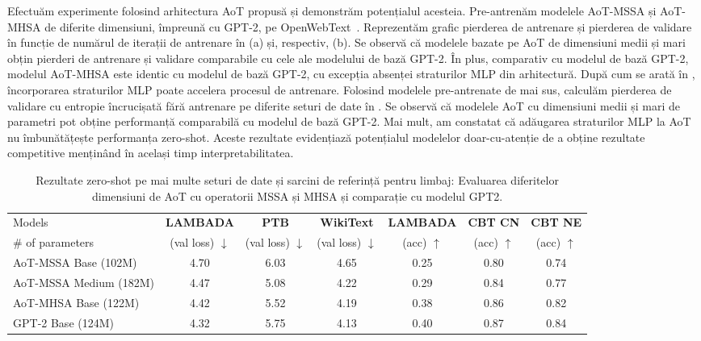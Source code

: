\documentclass[../../book-main_ro.tex]{subfiles}
\begin{document}
Efectuăm experimente folosind arhitectura AoT propusă și demonstrăm potențialul acesteia. Pre-antrenăm modelele AoT-MSSA și AoT-MHSA de diferite dimensiuni, împreună cu GPT-2, pe OpenWebText~\citep{Gokaslan2019OpenWeb}. Reprezentăm grafic pierderea de antrenare și pierderea de validare în funcție de numărul de iterații de antrenare în (a) și, respectiv, (b). Se observă că modelele bazate pe AoT de dimensiuni medii și mari obțin pierderi de antrenare și validare comparabile cu cele ale modelului de bază GPT-2. În plus, comparativ cu modelul de bază GPT-2, modelul AoT-MHSA este identic cu modelul de bază GPT-2, cu excepția absenței straturilor MLP din arhitectură. După cum se arată în , încorporarea straturilor MLP poate accelera procesul de antrenare. Folosind modelele pre-antrenate de mai sus, calculăm pierderea de validare cu entropie încrucișată fără antrenare pe diferite seturi de date în . Se observă că modelele AoT cu dimensiuni medii și mari de parametri pot obține performanță comparabilă cu modelul de bază GPT-2. Mai mult, am constatat că adăugarea straturilor MLP la AoT nu îmbunătățește performanța zero-shot. Aceste rezultate evidențiază potențialul modelelor doar-cu-atenție de a obține rezultate competitive menținând în același timp interpretabilitatea.  

\begin{table*}[!htbp]
\caption{Rezultate zero-shot pe mai multe seturi de date și sarcini de referință pentru limbaj: Evaluarea diferitelor dimensiuni de AoT cu operatorii MSSA și MHSA și comparație cu modelul GPT2.}\vskip 0.1in
\centering
\begin{small}
\begin{tabular}{l|cccccc}
\toprule
 Models  & {\bf LAMBADA} & {\bf PTB} & {\bf WikiText} & {\bf LAMBADA} & {\bf CBT CN} & {\bf CBT NE} \\
 \# of parameters  & (val loss) $\downarrow$ &  (val loss) $\downarrow$ &(val loss) $\downarrow$ & (acc) $\uparrow$ &(acc) $\uparrow$ &(acc) $\uparrow$ \\
 \midrule
 AoT-MSSA Base (102M) & 4.70 & 6.03 & 4.65 & 0.25 & 0.80 & 0.74\\
 AoT-MSSA Medium (182M) & 4.47 & 5.08 & 4.22 & 0.29 & 0.84 & 0.77 \\
 AoT-MHSA Base (122M) & 4.42 & 5.52 & 4.19 & 0.38 & 0.86 & 0.82\\
 GPT-2 Base (124M) & 4.32 & 5.75 & 4.13 &  0.40 &  0.87 &  0.84 \\
\bottomrule
\end{tabular}
\label{tab:zeroshot}
\end{small}
\end{table*} 
\vspace{-0.05in} 
\end{document}
